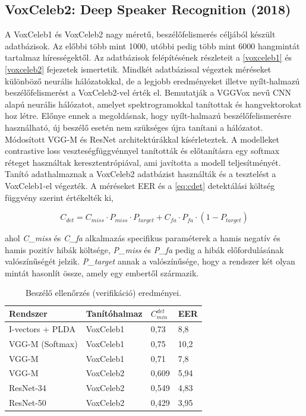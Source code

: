 \subsection{VoxCeleb2: Deep Speaker Recognition (2018)}

A VoxCeleb1 és VoxCeleb2 nagy méretű, beszélőfelismerés céljából készült adatbázisok. Az előbbi több mint 1000, utóbbi pedig több mint 6000 hangmintát tartalmaz hírességektől. Az adatbázisok felépítésének részleteit a \ref{voxceleb1} és \ref{voxceleb2} fejezetek ismertetik. Mindkét adatbázissal végeztek méréseket különböző neurális hálózatokkal, de a legjobb eredményeket illetve nyílt-halmazú beszélőfelismerést a VoxCeleb2-vel érték el.
\newline
\newline
Bemutatják a VGGVox nevű CNN alapú neurális hálózatot, amelyet spektrogramokkal tanítottak és hangvektorokat hoz létre. Előnye ennek a megoldásnak, hogy nyílt-halmazú beszélőfelismerésre használható, új beszélő esetén nem szükséges újra tanítani a hálózatot. 
\newline
\newline
Módosított VGG-M és ResNet architektúrákkal kísérleteztek. A modelleket contrastive loss veszteségfüggvénnyel tanították és előtanításra egy softmax réteget használtak keresztentrópiával, ami javította a modell teljesítményét. Tanító adathalmaznak a VoxCeleb2 adatbázist használták és a tesztelést a VoxCeleb1-el végezték. A méréseket EER és a \ref{eq:cdet} detektálási költség függvény szerint értékelték ki,

\begin{equation} \label{eq:cdet}
C_{det} = C_{miss} \cdot P_{miss} \cdot P_{target} + C_{fa} \cdot P_{fa} \cdot (1 - P_{target})
\end{equation}

ahol \emph{C\_miss} és \emph{C\_fa} alkalmazás specifikus paraméterek a hamis negatív és hamis pozitív hibák költsége, \emph{P\_miss} és \emph{P\_fa} pedig a hibák előfordulásának valószínűségét jelzik. \emph{P\_target} annak a valószínűsége, hogy a rendszer két olyan mintát hasonlít össze, amely egy embertől származik.
\newline
\begin{table}[!ht]
	\begin{tabular}{*4l} \toprule
		\bfseries Rendszer & \bfseries Tanítóhalmaz & \bfseries $C_{min}^{det}$ & \bfseries EER \\ \midrule
		I-vectors + PLDA & VoxCeleb1 & 0,73 & 8,8 \\
		VGG-M (Softmax) & VoxCeleb1 & 0,75 & 10,2 \\
		VGG-M & VoxCeleb1 & 0,71 & 7,8 \\
		VGG-M  & VoxCeleb2 & 0,609 & 5,94 \\
		ResNet-34 & VoxCeleb2 & 0,549 & 4,83 \\
		ResNet-50 & VoxCeleb2 & 0,429 & 3,95 \\
		\bottomrule
		\hline
	\end{tabular}
	\centering
	\caption{Beszélő ellenőrzés (verifikáció) eredményei.}
	\label{fig:sincnet-verification}
\end{table}
